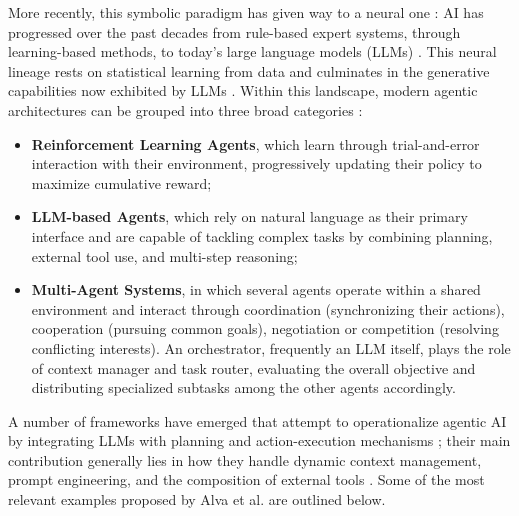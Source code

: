 \documentclass[12pt,a4paper,openright,twoside]{book}
\begin{document}
More recently, this symbolic paradigm has given way to a neural one \cite{DBLP:journals/air/AliDC26}:
AI has progressed over the past decades from rule-based expert systems, through learning-based methods,
to today's large language models (LLMs) \cite{DBLP:journals/apin/Gabauer26}.
This neural lineage rests on statistical learning from data and culminates in the generative capabilities
now exhibited by LLMs \cite{DBLP:journals/air/AliDC26}. Within this landscape, modern agentic architectures
can be grouped into three broad categories \cite{DBLP:journals/access/MorallesCRKSSPSR26, DBLP:journals/air/AliDC26, DBLP:journals/apin/Gabauer26}:

\begin{itemize}
    \item \textbf{Reinforcement Learning Agents}, which learn through trial-and-error interaction with their environment,
    progressively updating their policy to maximize cumulative reward;
    \item \textbf{LLM-based Agents}, which rely on natural language as their primary interface and are capable of tackling
    complex tasks by combining planning, external tool use, and multi-step reasoning;
    \item \textbf{Multi-Agent Systems}, in which several agents operate within a shared environment and interact through
    coordination (synchronizing their actions), cooperation (pursuing common goals), negotiation or competition (resolving conflicting interests).
    An orchestrator, frequently an LLM itself, plays the role of context manager and task router, evaluating the overall objective and distributing
    specialized subtasks among the other agents accordingly.
\end{itemize}

A number of frameworks have emerged that attempt to operationalize agentic AI by integrating LLMs with planning and action-execution mechanisms \cite{DBLP:journals/air/AlvaP26};
their main contribution generally lies in how they handle dynamic context management, prompt engineering, and the composition of external tools \cite{DBLP:journals/air/AliDC26}.
Some of the most relevant examples proposed by Alva et al. are outlined below.
\end{document}
